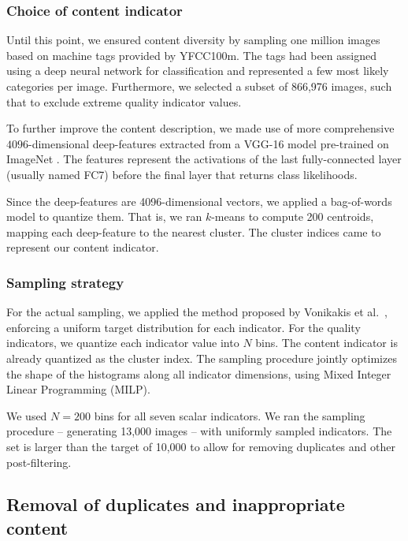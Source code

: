 \documentclass[10pt,journal,compsoc]{IEEEtran}
\begin{document}
\subsubsection{Choice of content indicator}

Until this point, we ensured content diversity by sampling one million images based on machine tags provided by YFCC100m. The tags had been assigned using a deep neural network for classification and represented a few most likely categories per image. Furthermore, we selected a subset of 866,976 images, such that to exclude extreme quality indicator values.

To further improve the content description, we made use of more comprehensive $4096$-dimensional deep-features extracted from a VGG-16 model pre-trained on ImageNet \cite{vgg}. The features represent the activations of the last fully-connected layer (usually named FC7) before the final layer that returns class likelihoods.

Since the deep-features are 4096-dimensional vectors, we applied a bag-of-words model to quantize them. That is, we ran $k$-means to compute 200 centroids, mapping each deep-feature to the nearest cluster. The cluster indices came to represent our content indicator.

\subsubsection{Sampling strategy}

For the actual sampling, we applied the method proposed by Vonikakis et al.~\cite{vonikakis2016shaping}, enforcing a uniform target distribution for each indicator. For the quality indicators, we quantize each indicator value into $N$ bins. The content indicator is already quantized as the cluster index. The sampling procedure jointly optimizes the shape of the histograms along all indicator dimensions, using Mixed Integer Linear Programming (MILP).

We used $N=200$ bins for all seven scalar indicators. We ran the sampling procedure -- generating 13,000 images -- with uniformly sampled indicators. The set is larger than the target of 10,000 to allow for removing duplicates and other post-filtering.

\subsection{Removal of duplicates and inappropriate content}
\end{document}
